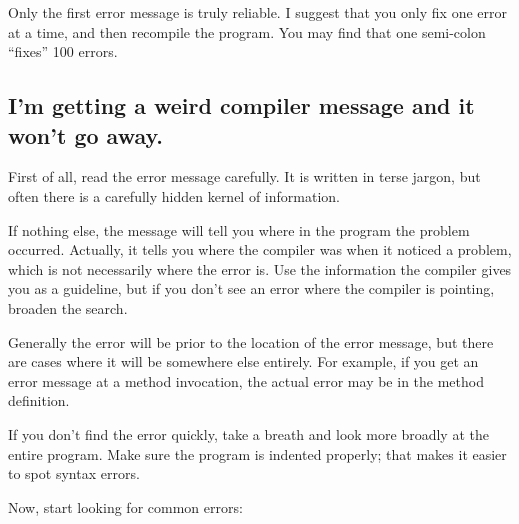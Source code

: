 \documentclass[12pt]{book}
\theoremstyle{exercise}
\begin{document}
Only the first error message is truly reliable.  I suggest
that you only fix one error at a time, and then recompile the
program.  You may find that one semi-colon ``fixes'' 100 errors.


\subsection*{I'm getting a weird compiler message and it
won't go away.}

First of all, read the error message carefully.  It is written in
terse jargon, but often there is a carefully hidden kernel of
information.

If nothing else, the message will tell you where in the program the
problem occurred.  Actually, it tells you where the compiler was
when it noticed a problem, which is not necessarily where the error
is.  Use the information the compiler gives you as a guideline,
but if you don't see an error where the compiler is pointing,
broaden the search.

Generally the error will be prior to the location of the error
message, but there are cases where it will be somewhere else
entirely.  For example, if you get an error message at a method
invocation, the actual error may be in the method definition.

If you don't find the error quickly, take a breath and look more
broadly at the entire program.  Make sure the program is indented
properly; that makes it easier to spot syntax errors.

Now, start looking for common errors:
\end{document}
